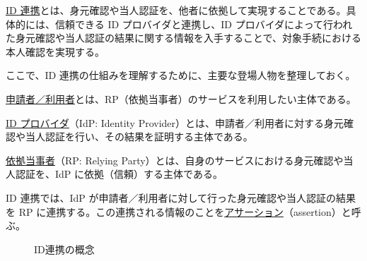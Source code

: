 \documentclass[uplatex]{jsarticle}
\def\label#1{}%
\begin{document}
\begin{dfn}\label{dfn:ch2b-federation-ds511}
\underline{ID 連携}とは、身元確認や当人認証を、他者に依拠して実現することである。具体的には、信頼できる ID プロバイダと連携し、ID プロバイダによって行われた身元確認や当人認証の結果に関する情報を入手することで、対象手続における本人確認を実現する。
\end{dfn}

ここで、ID 連携の仕組みを理解するために、主要な登場人物を整理しておく。

\begin{dfn}\label{dfn:ch2b-applicant-user}
\underline{申請者／利用者}とは、RP（依拠当事者）のサービスを利用したい主体である。
\end{dfn}

\begin{dfn}\label{dfn:idp}
\underline{ID プロバイダ}（IdP: Identity Provider）とは、申請者／利用者に対する身元確認や当人認証を行い、その結果を証明する主体である。
\end{dfn}

\begin{dfn}[依拠当事者（RP）]\label{dfn:rp}
\underline{依拠当事者}（RP: Relying Party）とは、自身のサービスにおける身元確認や当人認証を、IdP に依拠（信頼）する主体である。
\end{dfn}

\begin{dfn}[アサーション]\label{dfn:ch2b-assertion}
ID 連携では、IdP が申請者／利用者に対して行った身元確認や当人認証の結果を RP に連携する。この連携される情報のことを\underline{アサーション}（assertion）と呼ぶ。
\end{dfn}

\begin{figure}[H]
\centering
{}
\caption{ID連携の概念}
\label{fig:ch2b-federation-concept}
\end{figure}
\end{document}
